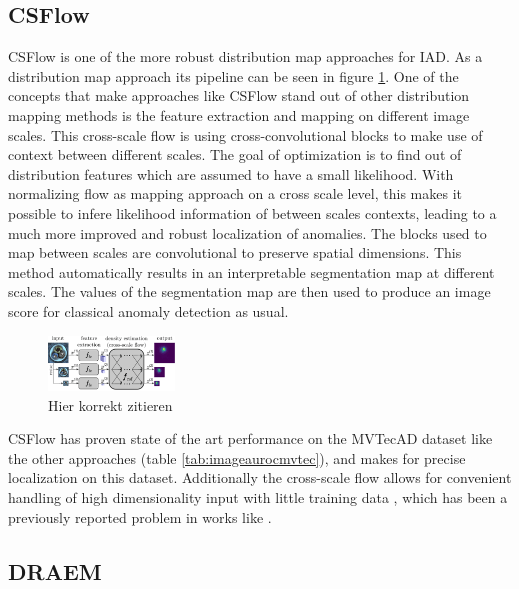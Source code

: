 \subsection{CSFlow}
\label{subsec:csflow}

CSFlow \cite{csflow2022} is one of the more robust distribution map approaches for IAD. As a distribution map approach its pipeline can be seen in figure \ref{fig:csflowpipeline}. One of the concepts that make 
approaches like CSFlow stand out of other distribution mapping methods is the feature extraction and mapping on different image scales. This cross-scale flow is using cross-convolutional 
blocks \cite{liu2024deep} to make use of context between different scales. The goal of optimization is to find out of distribution features which are assumed to have a small likelihood. 
With normalizing flow \cite{Kobyzev_2021normalizingflowexplanation} as mapping approach on a cross scale level, this makes it possible to infere likelihood information of between scales contexts, 
leading to a much more improved and robust localization of anomalies. The blocks used to map between scales 
are convolutional to preserve spatial dimensions. This method automatically results in an interpretable segmentation map at different scales. The values of the segmentation map are then used to produce an 
image score for classical anomaly detection as usual.

\begin{figure}[ht]
    \centering
    \includegraphics[width=0.3\textwidth]{figures/csflow_pipeline.png}
    \caption{Hier korrekt zitieren}
    \label{fig:csflowpipeline}
\end{figure}

CSFlow has proven state of the art performance on the MVTecAD dataset like the other approaches (table \ref{tab:imageaurocmvtec}), and makes for precise localization on this dataset. Additionally the cross-scale flow allows 
for convenient handling of high dimensionality input with little training data \cite{csflow2022}, which has been a previously reported problem in works like \cite{Rudolph_2021badNF}.


\subsection{DRAEM}
\label{subsec:DRAEM}

